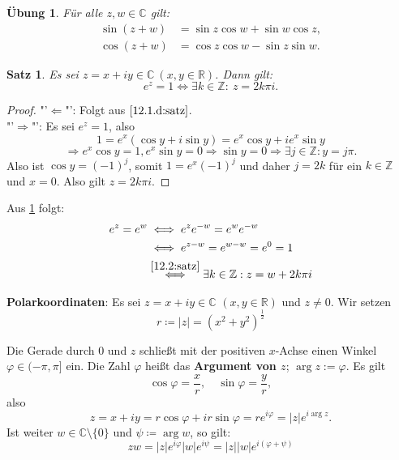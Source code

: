 \documentclass[12pt]{extreport} %
\newcommand{\C}{\mathbb{C}}
\newcommand{\R}{\mathbb{R}}
\newcommand{\Z}{\mathbb{Z}}
\theoremstyle{named}
\theoremstyle{itshape}
\newtheorem{satz}[unnamedtheorem]{Satz}
\theoremstyle{normal}
\newtheorem*{uebung}{Übung}
\begin{document}
{\begin{uebung}
	Für alle $z, w \in \C$ gilt:
	\begin{align*}
		\sin (z + w) & = \sin z \cos w + \sin w \cos z, \\
		\cos (z + w) & = \cos z \cos w - \sin z \sin w.
	\end{align*}	
\end{uebung}


\begin{satz} \label{12.2:satz}
	Es sei $z = x + i y \in \C ~(x, y \in \R)$. Dann gilt:
	$$ e^{z} = 1 \iff \exists k \in \Z: ~ z = 2 k \pi i. $$
\end{satz}


	
\begin{proof}
	"'$\Leftarrow$"': Folgt aus $\ref{12.1.d:satz}$. \\
	"'$\Rightarrow$"': Es sei $e^{z} = 1$, also 
	  $$1 = e^{x} ( \cos y + i \sin y) = e^{x} \cos y + i e^{x} \sin y$$
	  $$\Rightarrow e^{x} \cos y = 1, e^{x} \sin y = 0 \Rightarrow \sin y = 0 \Rightarrow \exists j \in \Z: y = j \pi.$$
	  Also ist $\cos y = (-1)^{j}$, somit $1 = e^{x} (-1)^{j}$ und daher $j = 2k$ für ein $k \in \Z$ und $x = 0$. 
	  Also gilt $z = 2k \pi i$.
\end{proof}

Aus \ref{12.2:satz} folgt:
	\begin{align*}
		e^{z} = e^{w} & \iff e^{z} e^{-w} = e^{w} e^{-w} \\
			& \iff e^{z-w} = e^{w - w} = e^{0} =1 \\
			& \overset{\ref{12.2:satz}}{\iff} \exists k \in \Z: z = w + 2 k \pi i
	\end{align*}


 
\textbf{Polarkoordinaten}: Es sei $z = x + iy \in \C$ $(x, y \in \R)$ und $z \neq 0$. Wir setzen
	$$ r \coloneqq |z| = (x^{2} + y^{2})^{\frac{1}{2}} $$
	
	Die Gerade durch $0$ und $z$ schließt mit der positiven $x$-Achse einen Winkel $\varphi \in (-\pi, \pi]$ ein.
	Die Zahl $\varphi$ hei{\ss}t das \textbf{Argument von $z$}; $\arg z:= \varphi$. Es gilt
		$$ \cos \varphi = \frac{x}{r}, \quad \sin \varphi = \frac{y}{r}, $$
	also
		$$  z = x + iy = r \cos \varphi + i r \sin \varphi = r e^{i \varphi} =  |z| e^{i \arg z}. $$
	Ist weiter $w \in \C\setminus\{0\}$ und $\psi \coloneqq \arg w$, so gilt:
		$$ z w = |z| e^{i \varphi} |w| e^{i \psi} = |z| |w| e^{i(\varphi + \psi)} $$
	
}
\end{document}
